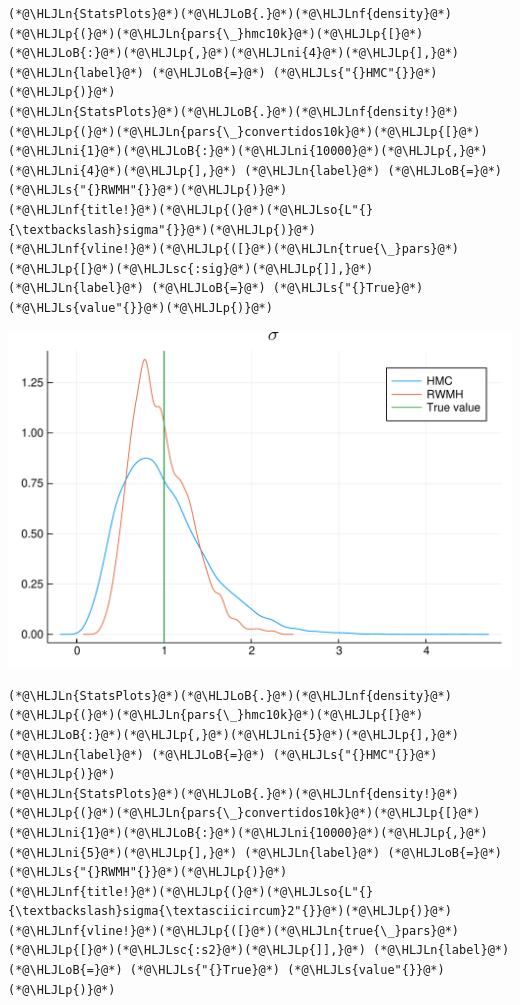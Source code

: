 \documentclass[12pt,a4paper]{article}
\newcommand{\HLJLn}[1]{#1}
\newcommand{\HLJLnf}[1]{\textcolor[RGB]{66,102,213}{#1}}
\newcommand{\HLJLs}[1]{\textcolor[RGB]{201,61,57}{#1}}
\newcommand{\HLJLsc}[1]{\textcolor[RGB]{201,61,57}{#1}}
\newcommand{\HLJLso}[1]{\textcolor[RGB]{201,61,57}{#1}}
\newcommand{\HLJLni}[1]{\textcolor[RGB]{59,151,46}{#1}}
\newcommand{\HLJLoB}[1]{\textcolor[RGB]{102,102,102}{\textbf{#1}}}
\newcommand{\HLJLp}[1]{#1}
\begin{document}
\begin{lstlisting}
(*@\HLJLn{StatsPlots}@*)(*@\HLJLoB{.}@*)(*@\HLJLnf{density}@*)(*@\HLJLp{(}@*)(*@\HLJLn{pars{\_}hmc10k}@*)(*@\HLJLp{[}@*)(*@\HLJLoB{:}@*)(*@\HLJLp{,}@*)(*@\HLJLni{4}@*)(*@\HLJLp{],}@*) (*@\HLJLn{label}@*) (*@\HLJLoB{=}@*) (*@\HLJLs{"{}HMC"{}}@*)(*@\HLJLp{)}@*)
(*@\HLJLn{StatsPlots}@*)(*@\HLJLoB{.}@*)(*@\HLJLnf{density!}@*)(*@\HLJLp{(}@*)(*@\HLJLn{pars{\_}convertidos10k}@*)(*@\HLJLp{[}@*)(*@\HLJLni{1}@*)(*@\HLJLoB{:}@*)(*@\HLJLni{10000}@*)(*@\HLJLp{,}@*)(*@\HLJLni{4}@*)(*@\HLJLp{],}@*) (*@\HLJLn{label}@*) (*@\HLJLoB{=}@*) (*@\HLJLs{"{}RWMH"{}}@*)(*@\HLJLp{)}@*)
(*@\HLJLnf{title!}@*)(*@\HLJLp{(}@*)(*@\HLJLso{L"{}{\textbackslash}sigma"{}}@*)(*@\HLJLp{)}@*)
(*@\HLJLnf{vline!}@*)(*@\HLJLp{([}@*)(*@\HLJLn{true{\_}pars}@*)(*@\HLJLp{[}@*)(*@\HLJLsc{:sig}@*)(*@\HLJLp{]],}@*) (*@\HLJLn{label}@*) (*@\HLJLoB{=}@*) (*@\HLJLs{"{}True}@*) (*@\HLJLs{value"{}}@*)(*@\HLJLp{)}@*)
\end{lstlisting}

\includegraphics[width=\linewidth]{figures/dsge_and_julia_56_1.pdf}

\begin{lstlisting}
(*@\HLJLn{StatsPlots}@*)(*@\HLJLoB{.}@*)(*@\HLJLnf{density}@*)(*@\HLJLp{(}@*)(*@\HLJLn{pars{\_}hmc10k}@*)(*@\HLJLp{[}@*)(*@\HLJLoB{:}@*)(*@\HLJLp{,}@*)(*@\HLJLni{5}@*)(*@\HLJLp{],}@*) (*@\HLJLn{label}@*) (*@\HLJLoB{=}@*) (*@\HLJLs{"{}HMC"{}}@*)(*@\HLJLp{)}@*)
(*@\HLJLn{StatsPlots}@*)(*@\HLJLoB{.}@*)(*@\HLJLnf{density!}@*)(*@\HLJLp{(}@*)(*@\HLJLn{pars{\_}convertidos10k}@*)(*@\HLJLp{[}@*)(*@\HLJLni{1}@*)(*@\HLJLoB{:}@*)(*@\HLJLni{10000}@*)(*@\HLJLp{,}@*)(*@\HLJLni{5}@*)(*@\HLJLp{],}@*) (*@\HLJLn{label}@*) (*@\HLJLoB{=}@*) (*@\HLJLs{"{}RWMH"{}}@*)(*@\HLJLp{)}@*)
(*@\HLJLnf{title!}@*)(*@\HLJLp{(}@*)(*@\HLJLso{L"{}{\textbackslash}sigma{\textasciicircum}2"{}}@*)(*@\HLJLp{)}@*)
(*@\HLJLnf{vline!}@*)(*@\HLJLp{([}@*)(*@\HLJLn{true{\_}pars}@*)(*@\HLJLp{[}@*)(*@\HLJLsc{:s2}@*)(*@\HLJLp{]],}@*) (*@\HLJLn{label}@*) (*@\HLJLoB{=}@*) (*@\HLJLs{"{}True}@*) (*@\HLJLs{value"{}}@*)(*@\HLJLp{)}@*)
\end{lstlisting}
\end{document}
